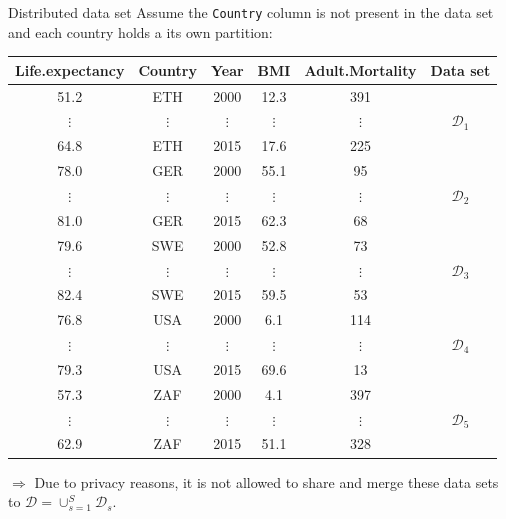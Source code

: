 \documentclass[t,10pt]{beamer}
\begin{document}
\begin{frame}{Distributed data set}
  Assume the \texttt{Country} column is not present in the data set and each country holds a its own partition:\vspace{-0.3cm}
  {\tiny
  \begin{table}
  \centering
  \begin{tabular}[t]{cccccc}
  \toprule
    \textbf{Life.expectancy} & {\color{lightgray}\textbf{Country}} & \textbf{Year} & \textbf{BMI} & \textbf{Adult.Mortality} & \textbf{Data set}\\
  \midrule
    51.2 & {\color{lightgray}ETH} & 2000 & 12.3 & 391 & \multirow{3}{*}{\color[HTML]{3B4992}\normalsize$\mathcal{D}_1$}\\
    {\tiny$\vdots$} & {\tiny\color{lightgray}$\vdots$} & {\tiny$\vdots$} & {\tiny$\vdots$} & {\tiny$\vdots$}\\
    64.8 & {\color{lightgray}ETH} & 2015 & 17.6 & 225\\ \hline
    78.0 & {\color{lightgray}GER} & 2000 & 55.1 & 95 & \multirow{3}{*}{\color[HTML]{EE0000}\normalsize$\mathcal{D}_2$}\\
    {\tiny$\vdots$} & {\tiny\color{lightgray}$\vdots$} & {\tiny$\vdots$} & {\tiny$\vdots$} & {\tiny$\vdots$}\\
    81.0 & {\color{lightgray}GER} & 2015 & 62.3 & 68\\ \hline
    79.6 & {\color{lightgray}SWE} & 2000 & 52.8 & 73 & \multirow{3}{*}{\color[HTML]{008B45}\normalsize$\mathcal{D}_3$}\\
    {\tiny$\vdots$} & {\tiny\color{lightgray}$\vdots$} & {\tiny$\vdots$} & {\tiny$\vdots$} & {\tiny$\vdots$}\\
    82.4 & {\color{lightgray}SWE} & 2015 & 59.5 & 53\\ \hline
    76.8 & {\color{lightgray}USA} & 2000 & 6.1  & 114 & \multirow{3}{*}{\color[HTML]{631879}\normalsize$\mathcal{D}_4$}\\
    {\tiny$\vdots$} & {\tiny\color{lightgray}$\vdots$} & {\tiny$\vdots$} & {\tiny$\vdots$} & {\tiny$\vdots$}\\
    79.3 & {\color{lightgray}USA} & 2015 & 69.6 & 13\\ \hline
    57.3 & {\color{lightgray}ZAF} & 2000 & 4.1 & 397 & \multirow{3}{*}{\color[HTML]{008280}\normalsize$\mathcal{D}_5$}\\
    {\tiny$\vdots$} & {\tiny\color{lightgray}$\vdots$} & {\tiny$\vdots$} & {\tiny$\vdots$} & {\tiny$\vdots$}\\
    62.9 & {\color{lightgray}ZAF} & 2015 & 51.1 & 328\\
  \bottomrule
  \end{tabular}
  \end{table}}
  $\Rightarrow$ Due to privacy reasons, it is not allowed to share and merge these data sets to $\mathcal{D} = \cup_{s=1}^S \mathcal{D}_s$.
\end{frame}
\end{document}
